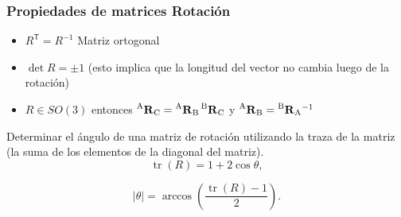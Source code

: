 \begin{frame}
\begin{equation*}
    \end{equation*}

\end{frame}


\begin{frame}
    \frametitle{Propiedades de matrices Rotación}
    \small
    \begin{itemize}
        \item $R^{\mathsf {T}}=R^{-1}$ Matriz ortogonal
        \item $\det R = \pm 1$ (esto implica que la longitud del vector no cambia luego de la rotación)
        \item $R \in SO(3)$ entonces $\prescript{\mathrm{A}}{}{{\boldsymbol{\mathbf{R}}}_\mathrm{C}} = \prescript{\mathrm{A}}{}{{\boldsymbol{\mathbf{R}}}_\mathrm{B}} \prescript{\mathrm{B}}{}{{\boldsymbol{\mathbf{R}}}_\mathrm{C}}$ y $\prescript{\mathrm{A}}{}{{\boldsymbol{\mathbf{R}}}_\mathrm{B}} = \prescript{\mathrm{B}}{}{{\boldsymbol{\mathbf{R}}}_\mathrm{A}}^{-1}$
    \end{itemize}

    Determinar el ángulo de una matriz de rotación utilizando la traza de la matriz (la suma de los elementos de la diagonal del matriz).
    \begin{equation*}
        {\displaystyle \operatorname {tr} (R)=1+2\cos \theta ,}
    \end{equation*}

    \begin{equation*}
        {\displaystyle |\theta |=\arccos \left({\frac {\operatorname {tr} (R)-1}{2}}\right).}
    \end{equation*}

\end{frame}

